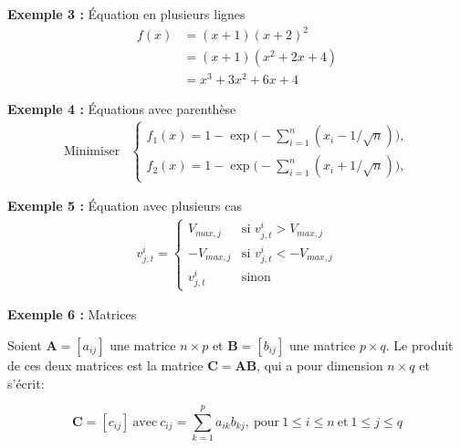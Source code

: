 \bigskip
{\noindent\bfseries Exemple 3 :} Équation en plusieurs lignes
\begin{align*}
	f(x)&=(x+1)(x+2)^2 \\
	&=(x+1)(x^2+2x+4) \\
	&=x^3+3x^2+6x+4
\end{align*}

\bigskip
{\noindent\bfseries Exemple 4 :} Équations avec parenthèse
\begin{equation}
	{\begin{array}{rl}
			\text{Minimiser} &
			\left\{
			\begin{array}{l}
				f_1(x)=1-\exp\bigl(-\sum_{i=1}^n(x_i-1/\sqrt{n})\bigr), \\
				f_2(x)=1-\exp\bigl(-\sum_{i=1}^n(x_i+1/\sqrt{n})\bigr),
			\end{array}
			\right.
	\end{array}}
\end{equation}

\bigskip
{\noindent\bfseries Exemple 5 :} Équation avec plusieurs cas
\begin{equation}
	\begin{array}{l}
		v_{j,t}^i=
		\left\{
		\begin{array}{ll}
			V_{max,j} & \text{si }v_{j,t}^i>V_{max,j} \\[0.2cm]
			-V_{max,j} & \text{si }v_{j,t}^i<-V_{max,j} \\[0.2cm]
			v_{j,t}^i & \text{sinon}
		\end{array}
		\right.
	\end{array}
\end{equation}

\bigskip
{\noindent\bfseries Exemple 6 :} Matrices

Soient $\mathbf{A}=[a_{ij}]$ une matrice $n\times p$ et $\mathbf{B}=[b_{ij}]$ une matrice $p\times q$. Le produit de ces deux matrices est la matrice $\mathbf{C}=\mathbf{A}\mathbf{B}$, qui a pour dimension $n\times q$ et s'écrit:

\begin{displaymath}
	\mathbf{C}=[c_{ij}] \ \text{avec} \ c_{ij}=\sum_{k=1}^{p}a_{ik}b_{kj}, \ \text{pour}\ 1\leq i\leq n \ \text{et} \ 1\leq j\leq q
\end{displaymath}

